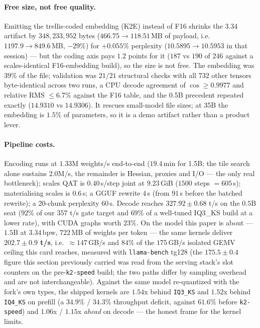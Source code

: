 \documentclass[11pt,a4paper]{article}
\newcommand{\bpw}{\,\mathrm{bpw}}
\begin{document}
\paragraph{Free size, not free quality.} Emitting the trellis-coded embedding (K2E) instead of
F16 shrinks the $3.34$ artifact by $348{,}233{,}952$ bytes ($466.75\to118.51$\,MB of payload, i.e.\
$1197.9\to849.6$\,MB, $-29\%$) for $+0.055\%$ perplexity ($10.5895\to10.5953$ in that session) --- but the coding axis pays $1.2$ points
for it ($187$ vs $190$ of $246$ against a scales-identical F16-embedding build), so the size is not free.
The embedding was $39\%$ of the file; validation was $21/21$ structural checks with all $732$ other tensors
byte-identical across two runs, a CPU decode agreement of $\cos\ge0.9977$ and relative RMS
$\le6.7\%$ against the F16 table, and the 0.5B precedent repeated exactly ($14.9310$ vs $14.9306$).
It rescues small-model file sizes; at 35B the embedding is $1.5\%$ of parameters, so it is a demo
artifact rather than a product lever.

\paragraph{Pipeline costs.} Encoding runs at $1.33$M weights/s end-to-end ($19.4$\,min for 1.5B; the tile
search alone sustains $2.0$M/s, the remainder is Hessian, proxies and I/O --- the only real bottleneck); scales QAT is $0.40$\,s/step joint at $9.23$\,GiB ($1500$ steps $=605$\,s);
materialising scales is $0.6$\,s; a GGUF rewrite $4$\,s (from $91$\,s before the batched rewrite); a
20-chunk perplexity $60$\,s. Decode
reaches $327.92\pm0.68$ t/s on the $0.5$B seat ($92\%$ of our $357$ t/s gate target and $69\%$ of
a well-tuned IQ3\_KS build at a lower rate), with CUDA graphs worth $23\%$. On the model this paper
is about --- $1.5$B at $3.34\bpw$, $722$\,MB of weights per token --- the same kernels deliver
\textbf{$202.7\pm0.9$ t/s}, i.e.\ $\approx147$\,GB/s and $84\%$ of the $175$\,GB/s isolated GEMV
ceiling this card reaches, measured with \texttt{llama-bench} tg128 (the $175.5\pm0.4$ figure this
section previously carried was read from the serving stack's slot counters on the pre-\texttt{k2-speed}
build; the two paths differ by sampling overhead and are not interchangeable).
Against the same model re-quantized with the fork's own types, the shipped kernels are $1.54$x behind
\texttt{IQ3\_KS} and $1.52$x behind \texttt{IQ4\_KS} on prefill (a $34.9\%$ / $34.3\%$ throughput
deficit, against $61.6\%$ before \texttt{k2-speed}) and $1.06$x / $1.15$x \emph{ahead} on decode ---
the honest frame for the kernel limits.
\end{document}

